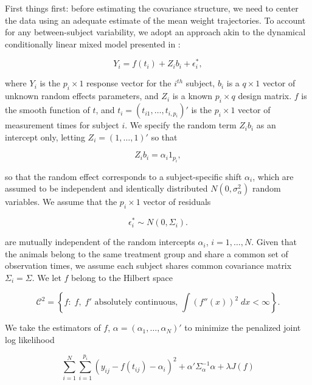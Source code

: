\bigskip


First things first: before estimating the covariance structure, we need to center the data using an adequate estimate of the mean weight trajectories. To account for any between-subject variability, we adopt an approach akin to the dynamical conditionally linear mixed model presented in \cite{pourahmadi2002dynamic}:

\begin{equation}
Y_i = f\left(t_i  \right) + Z_i b_i + \epsilon^*_i,
\end{equation} 

\noindent
where $Y_i$ is the $p_i \times 1$ response vector for the $i^{th}$ subject, $b_i$ is a $q \times 1$ vector of unknown random effects parameters, and $Z_i$ is a known $p_i \times q$ design matrix.  $f$ is the smooth function of $t$, and $t_i = \left(t_{i1}, \dots, t_{i,p_i}\right)'$ is the $p_i \times 1$ vector of measurement times for subject $i$. We specify the random term $Z_i b_i$ as an intercept only, letting $Z_i = \left(1 , \dots, 1\right)'$ so that 

\[
 Z_i b_i = \alpha_i 1_{p_i}, 
\] 

\noindent
so that the random effect corresponds to a subject-specific shift $\alpha_i$, which are assumed to be independent and identically distributed $N\left(0,\sigma_\alpha^2\right)$ random variables. We assume that the $p_i \times 1$ vector of residuals

\[
\epsilon^*_i \sim N\left(0, \Sigma_i\right).
\] 

\noindent
are mutually independent of the random intercepts $\alpha_i$, $i = 1,\dots, N$. Given that the animals belong to the same treatment group and share a common set of observation times, we assume each subject shares common covariance matrix $\Sigma_i = \Sigma$. We let $f$ belong to the Hilbert space

\[
\mathcal{C}^2 = \left\{f: \; f,\;f' \mbox{ absolutely continuous, } \int\left(f''\left(x\right)\right)^2 \;dx < \infty  \right\}. 
\]

\noindent
We take the estimators of $f$, $\alpha = \left(\alpha_1,\dots, \alpha_N\right)'$ to minimize the penalized joint log likelihood

\begin{equation}
\sum_{i = 1}^N \sum_{i = 1}^{p_i} \left(y_{ij} - f\left(t_{ij} \right) - \alpha_i \right)^2 + \alpha' \Sigma_\alpha^{-1} \alpha + \lambda J \left(f\right)
\end{equation}

